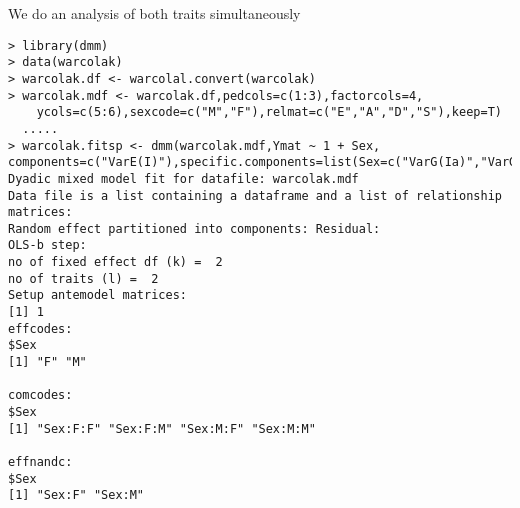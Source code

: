 \documentclass[titlepage]{article}  %
\begin{document}
We do an analysis of both traits simultaneously
\begin{verbatim}
> library(dmm)
> data(warcolak)
> warcolak.df <- warcolal.convert(warcolak)
> warcolak.mdf <- warcolak.df,pedcols=c(1:3),factorcols=4,
    ycols=c(5:6),sexcode=c("M","F"),relmat=c("E","A","D","S"),keep=T)
  .....
> warcolak.fitsp <- dmm(warcolak.mdf,Ymat ~ 1 + Sex, components=c("VarE(I)"),specific.components=list(Sex=c("VarG(Ia)","VarG(Id)","VarGs(Ia)")),relmat="withdf")
Dyadic mixed model fit for datafile: warcolak.mdf  
Data file is a list containing a dataframe and a list of relationship matrices:
Random effect partitioned into components: Residual:
OLS-b step:
no of fixed effect df (k) =  2 
no of traits (l) =  2 
Setup antemodel matrices:
[1] 1
effcodes:
$Sex
[1] "F" "M"

comcodes:
$Sex
[1] "Sex:F:F" "Sex:F:M" "Sex:M:F" "Sex:M:M"

effnandc:
$Sex
[1] "Sex:F" "Sex:M"


\end{verbatim}
\end{document}
